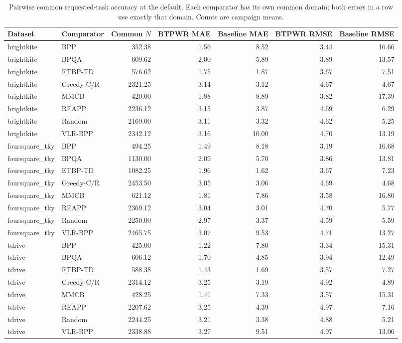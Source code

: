 \begin{table}[t]\centering\small
\caption{Pairwise common requested-task accuracy at the default. Each comparator has its own common domain; both errors in a row use exactly that domain. Counts are campaign means.}
\label{tab:q36-common}
\begin{tabular}{llrrrrr}\toprule
Dataset&Comparator&Common $N$&BTPWR MAE&Baseline MAE&BTPWR RMSE&Baseline RMSE\\\midrule
brightkite&BPP&352.38&1.56&8.52&3.44&16.66\\
brightkite&BPQA&609.62&2.00&5.89&3.89&13.57\\
brightkite&ETBP-TD&576.62&1.75&1.87&3.67&7.51\\
brightkite&Greedy-C/R&2321.25&3.14&3.12&4.67&4.67\\
brightkite&MMCB&420.00&1.88&8.89&3.82&17.39\\
brightkite&REAPP&2236.12&3.15&3.87&4.69&6.29\\
brightkite&Random&2169.00&3.11&3.32&4.62&5.25\\
brightkite&VLR-BPP&2342.12&3.16&10.00&4.70&13.19\\
foursquare\_tky&BPP&494.25&1.49&8.18&3.19&16.68\\
foursquare\_tky&BPQA&1130.00&2.09&5.70&3.86&13.81\\
foursquare\_tky&ETBP-TD&1082.25&1.96&1.62&3.67&7.23\\
foursquare\_tky&Greedy-C/R&2453.50&3.05&3.06&4.69&4.68\\
foursquare\_tky&MMCB&621.12&1.81&7.86&3.58&16.80\\
foursquare\_tky&REAPP&2369.12&3.04&3.01&4.70&5.77\\
foursquare\_tky&Random&2250.00&2.97&3.37&4.59&5.59\\
foursquare\_tky&VLR-BPP&2465.75&3.07&9.53&4.71&13.27\\
tdrive&BPP&425.00&1.22&7.80&3.34&15.31\\
tdrive&BPQA&606.12&1.70&4.85&3.94&12.49\\
tdrive&ETBP-TD&588.38&1.43&1.69&3.57&7.27\\
tdrive&Greedy-C/R&2314.12&3.25&3.19&4.92&4.89\\
tdrive&MMCB&428.25&1.41&7.33&3.57&15.31\\
tdrive&REAPP&2207.62&3.25&4.39&4.97&7.16\\
tdrive&Random&2244.25&3.21&3.38&4.88&5.21\\
tdrive&VLR-BPP&2338.88&3.27&9.51&4.97&13.06\\
\bottomrule\end{tabular}\end{table}
